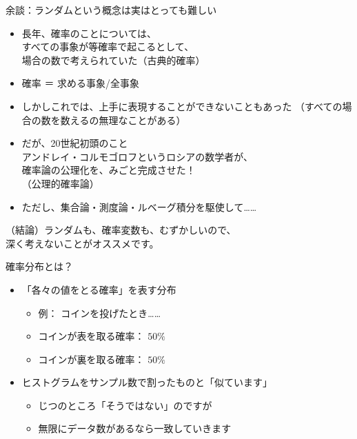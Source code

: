 \documentclass[dvipdfmx,cjk]{beamer}
\begin{document}
\begin{frame}{余談：ランダムという概念は実はとっても難しい} \pause


\begin{itemize}
    \item 長年、確率のことについては、\\
    すべての事象が等確率で起こるとして、\\
    場合の数で考えられていた（古典的確率） \pause
    \item 確率 ＝ 求める事象/全事象 \pause
    \item しかしこれでは、上手に表現することができないこともあった
    （すべての場合の数を数えるの無理なことがある） \pause

    \item だが、20世紀初頭のこと \\ \pause
    アンドレイ・コルモゴロフというロシアの数学者が、 \\
    確率論の公理化を、みごと完成させた！\\
    （公理的確率論） \pause

    \item ただし、集合論・測度論・ルベーグ積分を駆使して……  \pause
\end{itemize}

\vskip 1cm

（結論）ランダムも、確率変数も、むずかしいので、\\
深く考えないことがオススメです。


\end{frame}


\begin{frame}{確率分布とは？} \pause

\begin{itemize}

    \item 「各々の値をとる確率」を表す分布
        \begin{itemize}
        \item 例： コインを投げたとき……
        \item コインが表を取る確率： $50\%$
        \item コインが裏を取る確率： $50\%$  \pause
        \end{itemize}

    \item ヒストグラムをサンプル数で割ったものと「似ています」
        \begin{itemize}
        \item じつのところ「そうではない」のですが
        \item 無限にデータ数があるなら一致していきます
        \end{itemize}

\end{itemize}

\end{frame}
\end{document}
